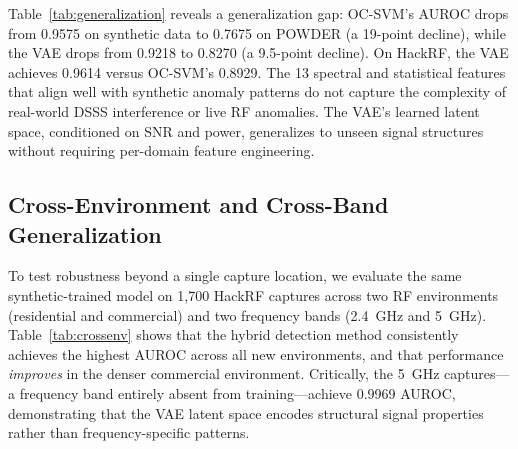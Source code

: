 \documentclass[conference]{IEEEtran}
\begin{document}
Table~\ref{tab:generalization} reveals a generalization gap: OC-SVM's AUROC drops from 0.9575 on synthetic data to 0.7675 on POWDER (a 19-point decline), while the VAE drops from 0.9218 to 0.8270 (a 9.5-point decline). On HackRF, the VAE achieves 0.9614 versus OC-SVM's 0.8929. The 13 spectral and statistical features that align well with synthetic anomaly patterns do not capture the complexity of real-world DSSS interference or live RF anomalies. The VAE's learned latent space, conditioned on SNR and power, generalizes to unseen signal structures without requiring per-domain feature engineering.

\subsection{Cross-Environment and Cross-Band Generalization}
To test robustness beyond a single capture location, we evaluate the same synthetic-trained model on 1{,}700 HackRF captures across two RF environments (residential and commercial) and two frequency bands (2.4~GHz and 5~GHz). Table~\ref{tab:crossenv} shows that the hybrid detection method consistently achieves the highest AUROC across all new environments, and that performance \emph{improves} in the denser commercial environment. Critically, the 5~GHz captures---a frequency band entirely absent from training---achieve 0.9969 AUROC, demonstrating that the VAE latent space encodes structural signal properties rather than frequency-specific patterns.

\begin{table}[t]
\caption{Cross-environment HackRF evaluation (AUROC). The model is trained on synthetic data only; no per-environment adaptation is performed. Bold indicates best method per row.}
\label{tab:crossenv}
\centering
{}
\end{table}
\end{document}
